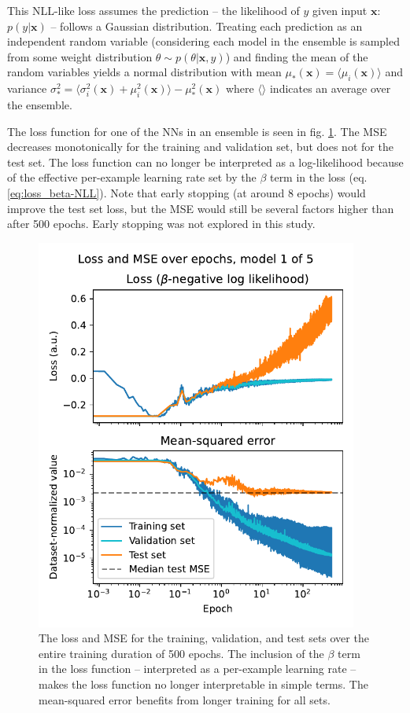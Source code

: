 This NLL-like loss assumes the prediction -- the likelihood of $y$ given input $\mathbf{x}$: $p(y|\mathbf{x})$ -- follows a Gaussian distribution. Treating each prediction as an independent random variable (considering each model in the ensemble is sampled from some weight distribution $\theta \sim p(\theta | \mathbf{x}, y)$) and finding the mean of the random variables yields a normal distribution with mean $\mu_* (\mathbf{x}) = \langle \mu_i(\mathbf{x}) \rangle $ and variance $\sigma^2_* = \langle \sigma^2_i(\mathbf{x}) + \mu^2_i(\mathbf{x}) \rangle - \mu^2_* (\mathbf{x})$ where $\langle \rangle$ indicates an average over the ensemble.

The loss function for one of the NNs in an ensemble is seen in fig. \ref{fig:beta-NLL_loss-mse}. The MSE decreases monotonically for the training and validation set, but does not for the test set. The loss function can no longer be interpreted as a log-likelihood because of the effective per-example learning rate set by the $\beta$ term in the loss (eq. \ref{eq:loss_beta-NLL}). Note that early stopping (at around 8 epochs) would improve the test set loss, but the MSE would still be several factors higher than after 500 epochs. Early stopping was not explored in this study.

\begin{figure}
	\centering
	\includegraphics[width=300pt]{figures/beta-NLL_loss-mse.pdf}
	\caption[size=12]{\label{fig:beta-NLL_loss-mse}The loss and MSE for the training, validation, and test sets over the entire training duration of 500 epochs. The inclusion of the $\beta$ term in the loss function -- interpreted as a per-example learning rate -- makes the loss function no longer interpretable in simple terms. The mean-squared error benefits from longer training for all sets.}
\end{figure}

